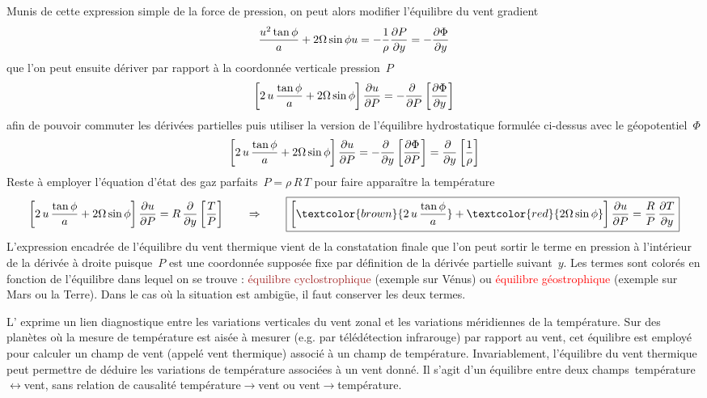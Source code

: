 \sk
Munis de cette expression simple de la force de pression, on peut alors modifier l'équilibre du vent gradient
\[ \dfrac{u^2\tan\phi}{a} + 2\Omega\sin\phi u = -\dfrac{1}{\rho}\dfrac{\partial P }{\partial y} = - \frac{\partial \Phi}{\partial y} \]
\noindent que l'on peut ensuite dériver par rapport à la coordonnée verticale pression~$P$ 
\[ \left[ 2 \, u \, \dfrac{\tan\phi}{a} + 2\Omega\sin\phi \right] \dfrac{\partial u }{\partial P} = - \dfrac{\partial ~ }{\partial P} \left[ \frac{\partial \Phi}{\partial y} \right] \]
\noindent afin de pouvoir commuter les dérivées partielles puis utiliser la version de l'équilibre hydrostatique formulée ci-dessus avec le géopotentiel~$\Phi$
\[ \left[ 2 \, u \, \dfrac{\tan\phi}{a} + 2\Omega\sin\phi \right] \dfrac{\partial u }{\partial P} = - \dfrac{\partial ~ }{\partial y} \left[\frac{\partial \Phi}{\partial P} \right] = \dfrac{\partial ~ }{\partial y} \left[ \frac{1}{\rho} \right] \]
\noindent Reste à employer l'équation d'état des gaz parfaits~$P=\rho\,R\,T$ pour faire apparaître la température
\[ \left[ 2 \, u \, \dfrac{\tan\phi}{a} + \fcoriolis \right] \der{u}{P} = R \, \frac{\partial}{\partial y} \left[ \frac{T}{P} \right] 
\qquad \Rightarrow \qquad
\boxed{ \left[ \textcolor{brown}{2\,u\,\frac{\tan\phi}{a}} + \textcolor{red}{\fcoriolis} \right] \der{u}{P} = \frac{R}{P} \, \frac{\partial T}{\partial y} }
\]
\noindent L'expression encadrée de l'équilibre du vent thermique vient de la constatation finale que l'on peut sortir le terme en pression à l'intérieur de la dérivée à droite puisque~$P$ est une coordonnée supposée fixe par définition de la dérivée partielle suivant~$y$. Les termes sont colorés en fonction de l'équilibre dans lequel on se trouve : \textcolor{brown}{équilibre cyclostrophique} (exemple sur Vénus) ou \textcolor{red}{équilibre géostrophique} (exemple sur Mars ou la Terre). Dans le cas où la situation est ambigüe, il faut conserver les deux termes.

\sk
L' exprime un lien diagnostique entre les variations verticales du vent zonal et les variations méridiennes de la température. Sur des planètes où la mesure de température est aisée à mesurer (e.g. par télédétection infrarouge) par rapport au vent, cet équilibre est employé pour calculer un champ de vent (appelé vent thermique) associé à un champ de température. Invariablement, l'équilibre du vent thermique peut permettre de déduire les variations de température associées à un vent donné. Il s'agit d'un équilibre entre deux champs~température$\leftrightarrow$vent, sans relation de causalité température$\rightarrow$vent ou vent$\rightarrow$température.

